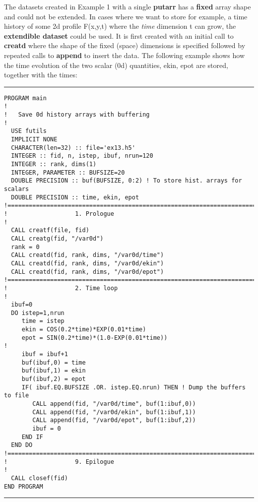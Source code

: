 \documentclass[a4paper]{article}
\begin{document}
The datasets created in Example 1 with a single {\bfseries putarr} has a
{\bfseries fixed} array shape and could not be extended. In cases where we want
to store for example, a time history of some 2d profile
F(x,y,t) where the {\itshape time\/} dimension t can grow, the {\bfseries extendible
dataset} could be used. It is first created with an initial call to
{\bfseries creatd} where the shape of the fixed (space) dimensions is specified followed
by repeated calls to {\bfseries append} to insert the data. The following example
shows how the time evolution of the two scalar (0d) quantities, {\ttfamily ekin,
epot} are stored, together with the times:
\par
\addvspace{\medskipamount}
\nopagebreak\hrule
\begin{verbatim}
PROGRAM main
!
!   Save 0d history arrays with buffering
!
  USE futils
  IMPLICIT NONE
  CHARACTER(len=32) :: file='ex13.h5'
  INTEGER :: fid, n, istep, ibuf, nrun=120
  INTEGER :: rank, dims(1)
  INTEGER, PARAMETER :: BUFSIZE=20
  DOUBLE PRECISION :: buf(BUFSIZE, 0:2) ! To store hist. arrays for scalars
  DOUBLE PRECISION :: time, ekin, epot
!===========================================================================
!                   1. Prologue
!
  CALL creatf(file, fid)
  CALL creatg(fid, "/var0d")
  rank = 0
  CALL creatd(fid, rank, dims, "/var0d/time")
  CALL creatd(fid, rank, dims, "/var0d/ekin")
  CALL creatd(fid, rank, dims, "/var0d/epot")
!===========================================================================
!                   2. Time loop
!
  ibuf=0
  DO istep=1,nrun
     time = istep
     ekin = COS(0.2*time)*EXP(0.01*time)
     epot = SIN(0.2*time)*(1.0-EXP(0.01*time))
!
     ibuf = ibuf+1
     buf(ibuf,0) = time
     buf(ibuf,1) = ekin
     buf(ibuf,2) = epot
     IF( ibuf.EQ.BUFSIZE .OR. istep.EQ.nrun) THEN ! Dump the buffers to file
        CALL append(fid, "/var0d/time", buf(1:ibuf,0))
        CALL append(fid, "/var0d/ekin", buf(1:ibuf,1))
        CALL append(fid, "/var0d/epot", buf(1:ibuf,2))
        ibuf = 0
     END IF
  END DO
!===========================================================================
!                   9. Epilogue
!
  CALL closef(fid)
END PROGRAM
\end{verbatim}
\nopagebreak\hrule
\addvspace{\medskipamount}
\end{document}
